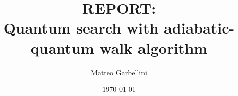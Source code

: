 \documentclass[aps,pra,reprint]{revtex4-2}
\begin{document}

\title{REPORT: \\ Quantum search with adiabatic-quantum walk algorithm}


\author{Matteo Garbellini}


\date{\today}


\end{document}

